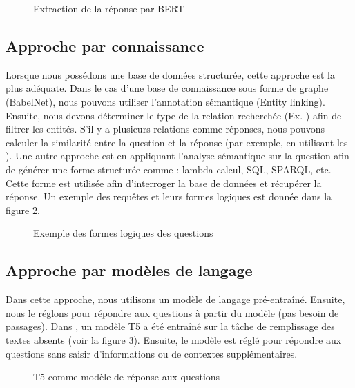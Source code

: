 \documentclass{KodeBook}
\begin{document}
\begin{figure}[!ht]
	\centering
	\caption[Extraction de la réponse par BERT]{Extraction de la réponse par BERT \cite{2019-jurafsky-martin}}
	\label{fig:qr-ri-devlin}
\end{figure}

\subsection{Approche par connaissance}

Lorsque nous possédons une base de données structurée, cette approche est la plus adéquate. 
Dans le cas d'une base de connaissance sous forme de graphe (BabelNet), nous pouvons utiliser l'annotation sémantique (Entity linking). 
Ensuite, nous devons déterminer le type de la relation recherchée (Ex. ) afin de filtrer les entités.
S'il y a plusieurs relations comme réponses, nous pouvons calculer la similarité entre la question et la réponse (par exemple, en utilisant les ). 
Une autre approche est en appliquant l'analyse sémantique sur la question afin de générer une forme structurée comme : lambda calcul, SQL, SPARQL, etc.
Cette forme est utilisée afin d'interroger la base de données et récupérer la réponse.
Un exemple des requêtes et leurs formes logiques est donnée dans la figure \ref{fig:qr-conn}.

\begin{figure}[!ht]
	\centering
	\caption[Exemple des formes logiques des questions]{Exemple des formes logiques des questions \cite{2020-jurafsky-martin}}
	\label{fig:qr-conn}
\end{figure}

\subsection{Approche par modèles de langage}

Dans cette approche, nous utilisons un modèle de langage pré-entraîné. 
Ensuite, nous le réglons pour répondre aux questions à partir du modèle (pas besoin de passages). 
Dans \cite{2020-roberts-al}, un modèle T5 a été entraîné  sur la tâche de remplissage des textes absents (voir la figure \ref{fig:qr-modele-t5}).
Ensuite, le modèle est réglé pour répondre aux questions sans saisir d'informations ou de contextes supplémentaires.

\begin{figure}[!ht]
	\centering
	\caption[T5 comme modèle de réponse aux questions]{T5 comme modèle de réponse aux questions \cite{2020-roberts-al}}
	\label{fig:qr-modele-t5}
\end{figure}
\end{document}
